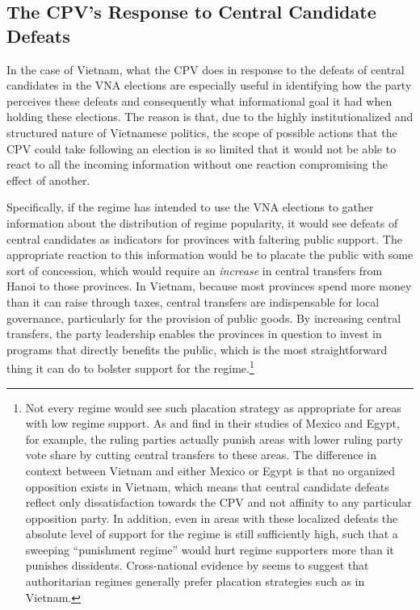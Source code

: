 \documentclass[12pt]{article}
\newcommand{\1}{\mathbbm{1}}
\begin{document}


\subsection{The CPV's Response to Central Candidate Defeats}
\label{sec:vietnam_local_defeat}

In the case of Vietnam, what the CPV does in response to the defeats of central candidates in the VNA elections are especially useful in identifying how the party perceives these defeats and consequently what informational goal it had when holding these elections. The reason is that, due to the highly institutionalized and structured nature of Vietnamese politics, the scope of possible actions that the CPV could take following an election is so limited that it would not be able to react to all the incoming information without one reaction compromising the effect of another.

Specifically, if the regime has intended to use the VNA elections to gather information about the distribution of regime popularity, it would see defeats of central candidates as indicators for provinces with faltering public support. The appropriate reaction to this information would be to placate the public with some sort of concession, which would require an \textit{increase} in central transfers from Hanoi to those provinces. In Vietnam, because most provinces spend more money than it can raise through taxes, central transfers are indispensable for local governance, particularly for the provision of public goods. By increasing central transfers, the party leadership enables the provinces in question to invest in programs that directly benefits the public, which is the most straightforward thing it can do to bolster support for the regime.\footnote{Not every regime would see such placation strategy as appropriate for areas with low regime support. As \citet{Magaloni2006} and \citet{Blaydes2008} find in their studies of Mexico and Egypt, for example, the ruling parties actually punish areas with lower ruling party vote share by cutting central transfers to these areas. The difference in context between Vietnam and either Mexico or Egypt is that no organized opposition exists in Vietnam, which means that central candidate defeats reflect only dissatisfaction towards the CPV and not affinity to any particular opposition party. In addition, even in areas with these localized defeats the absolute level of support for the regime is still sufficiently high, such that a sweeping ``punishment regime'' \citep{Magaloni2006} would hurt regime supporters more than it punishes dissidents.  Cross-national evidence by \citet{Miller2015} seems to suggest that authoritarian regimes generally prefer placation strategies such as in Vietnam.}
\end{document}
